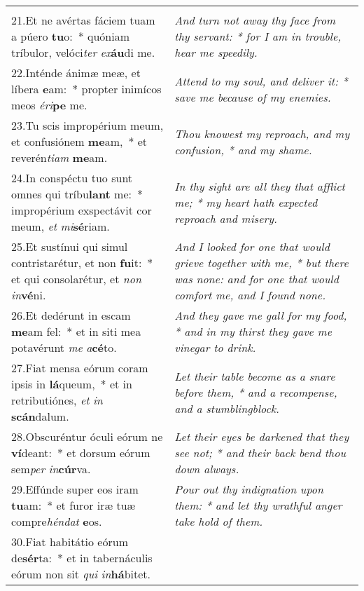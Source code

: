 \begin{longtable}{@{\hskip0pt} p{9.5cm} | p{6.5cm} @{\hskip0pt}}
{}\\
21.\enspace Et ne avértas fáciem tuam a púero \textbf{tu}o:~* quóniam tríbulor, velóci\textit{ter} \textit{ex}\textbf{áu}di me.
 & \textit{\small And turn not away thy face from thy servant: * for I am in trouble, hear me speedily.
}\\
22.\enspace Inténde ánimæ meæ, et líbera \textbf{e}am:~* propter inimícos meos \textit{é}\textit{ri}\textbf{pe} me.
 & \textit{\small Attend to my soul, and deliver it: * save me because of my enemies.
}\\
23.\enspace Tu scis impropérium meum, et confusiónem \textbf{me}am,~* et reverén\textit{ti}\textit{am} \textbf{me}am.
 & \textit{\small Thou knowest my reproach, and my confusion, * and my shame.
}\\
24.\enspace In conspéctu tuo sunt omnes qui tríbu\textbf{lant} me:~* impropérium exspectávit cor meum, \textit{et} \textit{mi}\textbf{sé}riam.
 & \textit{\small In thy sight are all they that afflict me; * my heart hath expected reproach and misery.
}\\
25.\enspace Et sustínui qui simul contristarétur, et non \textbf{fu}it:~* et qui consolarétur, et \textit{non} \textit{in}\textbf{vé}ni.
 & \textit{\small And I looked for one that would grieve together with me, * but there was none: and for one that would comfort me, and I found none.
}\\
26.\enspace Et dedérunt in escam \textbf{me}am fel:~* et in siti mea potavérunt \textit{me} \textit{a}\textbf{cé}to.
 & \textit{\small And they gave me gall for my food, * and in my thirst they gave me vinegar to drink.
}\\
27.\enspace Fiat mensa eórum coram ipsis in \textbf{lá}queum,~* et in retributiónes, \textit{et} \textit{in} \textbf{scán}dalum.
 & \textit{\small Let their table become as a snare before them, * and a recompense, and a stumblingblock.
}\\
28.\enspace Obscuréntur óculi eórum ne \textbf{ví}deant:~* et dorsum eórum sem\textit{per} \textit{in}\textbf{cúr}va.
 & \textit{\small Let their eyes be darkened that they see not; * and their back bend thou down always.
}\\
29.\enspace Effúnde super eos iram \textbf{tu}am:~* et furor iræ tuæ compre\textit{hén}\textit{dat} \textbf{e}os.
 & \textit{\small Pour out thy indignation upon them: * and let thy wrathful anger take hold of them.
}\\
30.\enspace Fiat habitátio eórum de\textbf{sér}ta:~* et in tabernáculis eórum non sit \textit{qui} \textit{in}\textbf{há}bitet.

\end{longtable}
